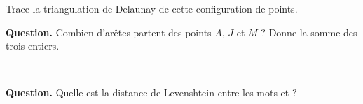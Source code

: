 \documentclass[class=report,crop=false, 12pt]{standalone}
\begin{document}
\begin{enigme}[Triangulation]

Trace la triangulation de Delaunay de cette configuration de points.



\bigskip

\textbf{Question.} Combien d'arêtes partent des points $A$, $J$ et $M$ ? Donne la somme des trois entiers.

%
%
%

\end{enigme}



\begin{enigme}
  
  ~
  
\bigskip

\textbf{Question.} Quelle est la distance de Levenshtein entre les mots
 et  ?


\end{enigme}
\end{document}
